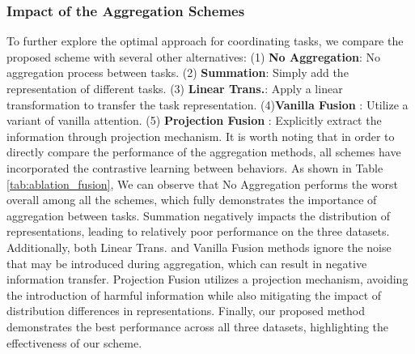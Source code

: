 \subsubsection{Impact of the Aggregation Schemes}
\label{knowledge_fusion}
\begin{table}[t]
    \setlength{\abovecaptionskip}{0cm}
    \setlength{\belowcaptionskip}{0mm}
    \caption{Performances of different aggregation schemes.}
    \centering
    \begin{threeparttable}
    \end{threeparttable}
    \vspace{-4mm}
    \label{tab:ablation_fusion}
\end{table}

To further explore the optimal approach for coordinating tasks, we compare the proposed scheme with several other alternatives: (1) \textbf{No Aggregation}: No aggregation process between tasks. (2) \textbf{Summation}: Simply add the representation of different tasks. (3) \textbf{Linear Trans.}: Apply a linear transformation to transfer the task representation. (4)\textbf{Vanilla Fusion} \cite{pkef}: Utilize a variant of vanilla attention\cite{atrank}. (5) \textbf{Projection Fusion} \cite{dumn}: Explicitly extract the information through projection mechanism. It is worth noting that in order to directly compare the performance of the aggregation methods, all schemes have incorporated the contrastive learning between behaviors. As shown in Table \ref{tab:ablation_fusion}, We can observe that No Aggregation performs the worst overall among all the schemes, which fully demonstrates the importance of aggregation between tasks. Summation negatively impacts the distribution of representations, leading to relatively poor performance on the three datasets. Additionally, both Linear Trans. and Vanilla Fusion methods ignore the noise that may be introduced during aggregation, which can result in negative information transfer. Projection Fusion utilizes a projection mechanism, avoiding the introduction of harmful information while also mitigating the impact of distribution differences in representations. Finally, our proposed method demonstrates the best performance across all three datasets, highlighting the effectiveness of our scheme.


